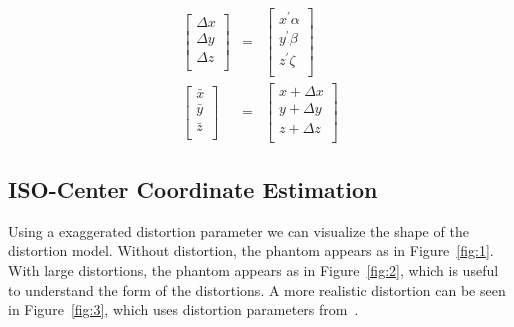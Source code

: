 \begin{eqnarray}
\begin{bmatrix}
  \Delta x \\
  \Delta y \\
  \Delta z \\
\end{bmatrix}
& = &
\begin{bmatrix}
x^\prime \alpha \\
y^\prime \beta \\
z^\prime \zeta \\
\end{bmatrix}
\label{eq2}
\\
\begin{bmatrix}
\bar{x} \\
\bar{y} \\
\bar{z} \\
\end{bmatrix}
& = &
\begin{bmatrix}
x + \Delta x \\
y + \Delta y \\
z + \Delta z \\
\end{bmatrix}
\label{eq3}
\end{eqnarray}

\subsection{ISO-Center Coordinate Estimation}

Using a exaggerated distortion parameter we can visualize the shape of the distortion model. Without distortion, the phantom appears as in Figure~\ref{fig:1}.  With large distortions, the phantom appears as in Figure~\ref{fig:2}, which is useful to understand the form of the distortions.  A more realistic distortion can be seen in Figure~\ref{fig:3}, which uses distortion parameters from~\cite{LSS08b}.


